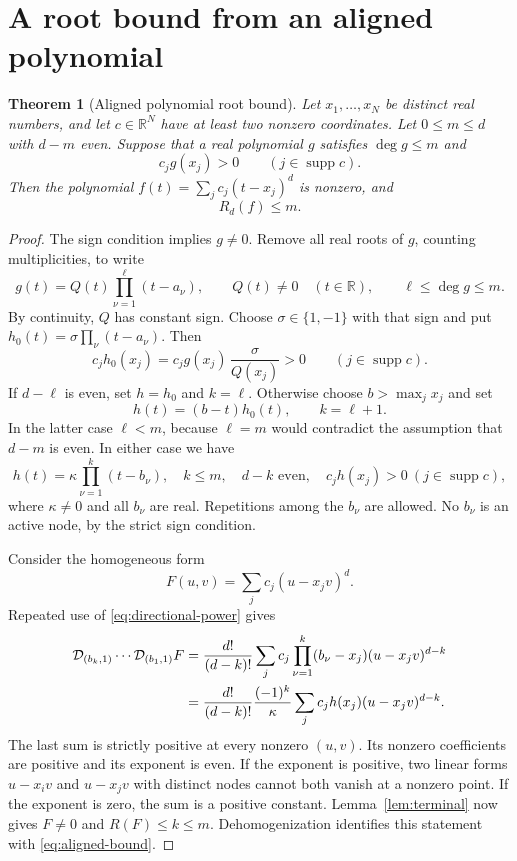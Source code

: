 \documentclass[11pt,a4paper]{article}
\numberwithin{equation}{section}
\newtheorem{theorem}{Theorem}[section]
\theoremstyle{remark}
\newcommand{\R}{\mathbb R}
\newcommand{\supp}{\operatorname{supp}}
\newcommand{\dd}{\mathcal D}
\begin{document}
\section{A root bound from an aligned polynomial}

\begin{theorem}[Aligned polynomial root bound]\label{thm:aligned}
Let $x_1,\ldots,x_N$ be distinct real numbers, and let $c\in\R^N$ have at
least two nonzero coordinates. Let $0\le m\le d$ with $d-m$ even. Suppose
that a real polynomial $g$ satisfies $\deg g\le m$ and
\[
 c_jg(x_j)>0\qquad(j\in\supp c).
\]
Then the polynomial
$f(t)=\sum_jc_j(t-x_j)^d$ is nonzero, and
\begin{equation}\label{eq:aligned-bound}
 R_d(f)\le m.
\end{equation}
\end{theorem}

\begin{proof}
The sign condition implies $g\ne0$. Remove all real roots of $g$, counting
multiplicities, to write
\[
 g(t)=Q(t)\prod_{\nu=1}^{\ell}(t-a_\nu),
 \qquad Q(t)\ne0\quad(t\in\R),
 \qquad \ell\le\deg g\le m.
\]
By continuity, $Q$ has constant sign. Choose $\sigma\in\{1,-1\}$ with that
sign and put $h_0(t)=\sigma\prod_\nu(t-a_\nu)$. Then
\[
 c_jh_0(x_j)=c_jg(x_j)\,\frac{\sigma}{Q(x_j)}>0
 \qquad(j\in\supp c).
\]
If $d-\ell$ is even, set $h=h_0$ and $k=\ell$. Otherwise choose
$b>\max_jx_j$ and set
\[
 h(t)=(b-t)h_0(t),\qquad k=\ell+1.
\]
In the latter case $\ell<m$, because $\ell=m$ would contradict the
assumption that $d-m$ is even. In either case we have
\begin{equation}\label{eq:split-aligned}
 h(t)=\kappa\prod_{\nu=1}^{k}(t-b_\nu),\quad
 k\le m,\quad d-k\text{ even},\quad
 c_jh(x_j)>0\ (j\in\supp c),
\end{equation}
where $\kappa\ne0$ and all $b_\nu$ are real. Repetitions among the $b_\nu$
are allowed. No $b_\nu$ is an active node, by the strict sign condition.

Consider the homogeneous form
\[
 F(u,v)=\sum_jc_j(u-x_jv)^d.
\]
Repeated use of \eqref{eq:directional-power} gives
\begin{align}\label{eq:terminal-form}
 \dd_{(b_k,1)}\cdots\dd_{(b_1,1)}F
 &=\frac{d!}{(d-k)!}\sum_jc_j
        \prod_{\nu=1}^{k}(b_\nu-x_j)(u-x_jv)^{d-k}\notag\\
 &=\frac{d!}{(d-k)!}\frac{(-1)^k}{\kappa}
        \sum_jc_jh(x_j)(u-x_jv)^{d-k}.
\end{align}
The last sum is strictly positive at every nonzero $(u,v)$. Its nonzero
coefficients are positive and its exponent is even. If the exponent is
positive, two linear forms $u-x_iv$ and $u-x_jv$ with distinct nodes cannot
both vanish at a nonzero point. If the exponent is zero, the sum is a
positive constant. Lemma~\ref{lem:terminal} now gives $F\ne0$ and
$R(F)\le k\le m$. Dehomogenization identifies this statement with
\eqref{eq:aligned-bound}.
\end{proof}
\end{document}
